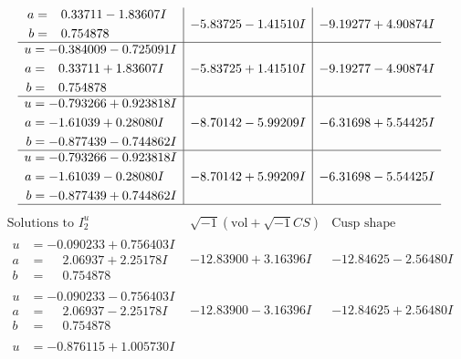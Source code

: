 \documentclass[1p]{elsarticle_modified}
\theoremstyle{definition}
\newcommand{\I}{\sqrt{-1}}
\begin{document}
$$\begin{array}{c|c|c}
\begin{aligned}
a &= \phantom{-}0.33711 - 1.83607 I \\
b &= \phantom{-}0.754878\phantom{ +0.000000I}\end{aligned}
 & -5.83725 - 1.41510 I & -9.19277 + 4.90874 I \\ \hline\begin{aligned}
u &= -0.384009 - 0.725091 I \\
a &= \phantom{-}0.33711 + 1.83607 I \\
b &= \phantom{-}0.754878\phantom{ +0.000000I}\end{aligned}
 & -5.83725 + 1.41510 I & -9.19277 - 4.90874 I \\ \hline\begin{aligned}
u &= -0.793266 + 0.923818 I \\
a &= -1.61039 + 0.28080 I \\
b &= -0.877439 - 0.744862 I\end{aligned}
 & -8.70142 - 5.99209 I & -6.31698 + 5.54425 I \\ \hline\begin{aligned}
u &= -0.793266 - 0.923818 I \\
a &= -1.61039 - 0.28080 I \\
b &= -0.877439 + 0.744862 I\end{aligned}
 & -8.70142 + 5.99209 I & -6.31698 - 5.54425 I\\
 \hline 
 \end{array}$$\newpage$$\begin{array}{c|c|c}  
\text{Solutions to }I^u_{2}& \I (\text{vol} + \sqrt{-1}CS) & \text{Cusp shape}\\
 \hline 
\begin{aligned}
u &= -0.090233 + 0.756403 I \\
a &= \phantom{-}2.06937 + 2.25178 I \\
b &= \phantom{-}0.754878\phantom{ +0.000000I}\end{aligned}
 & -12.83900 + 3.16396 I & -12.84625 - 2.56480 I \\ \hline\begin{aligned}
u &= -0.090233 - 0.756403 I \\
a &= \phantom{-}2.06937 - 2.25178 I \\
b &= \phantom{-}0.754878\phantom{ +0.000000I}\end{aligned}
 & -12.83900 - 3.16396 I & -12.84625 + 2.56480 I \\ \hline\begin{aligned}
u &= -0.876115 + 1.005730 I \\

\end{aligned}
\end{array}$$
\end{document}
